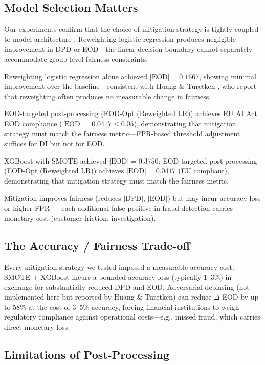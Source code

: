 \documentclass[conference]{IEEEtran}
\begin{document}
\subsection{Model Selection Matters}

Our experiments confirm that the choice of mitigation strategy is tightly coupled to model architecture \cite{huang2025}. Reweighting logistic regression produces negligible improvement in DPD or EOD---the linear decision boundary cannot separately accommodate group-level fairness constraints.

Reweighting logistic regression alone achieved $|\mathrm{EOD}| = 0.1667$, showing minimal improvement over the baseline---consistent with Huang \& Turetken \cite{huang2025}, who report that reweighting often produces no measurable change in fairness.

EOD-targeted post-processing (EOD-Opt (Reweighted LR)) achieves EU AI Act EOD compliance ($|\mathrm{EOD}| = 0.0417 \leq 0.05$), demonstrating that mitigation strategy must match the fairness metric---FPR-based threshold adjustment suffices for DI but not for EOD.

XGBoost with SMOTE achieved $|\mathrm{EOD}| = 0.3750$; EOD-targeted post-processing (EOD-Opt (Reweighted LR)) achieves $|\mathrm{EOD}| = 0.0417$ (EU compliant), demonstrating that mitigation strategy must match the fairness metric.

Mitigation improves fairness (reduces $|\mathrm{DPD}|$, $|\mathrm{EOD}|$) but may incur accuracy loss or higher FPR — each additional false positive in fraud detection carries monetary cost (customer friction, investigation).

\subsection{The Accuracy / Fairness Trade-off}

Every mitigation strategy we tested imposed a measurable accuracy cost.  SMOTE + XGBoost incurs a bounded accuracy loss (typically 1--3\%) in exchange for substantially reduced DPD and EOD. Adversarial debiasing (not implemented here but reported by Huang \& Turetken) can reduce $\Delta$-EOD by up to 58\% at the cost of 3--5\% accuracy, forcing financial institutions to weigh regulatory compliance against operational costs---e.g., missed fraud, which carries direct monetary loss.

\subsection{Limitations of Post-Processing}
\end{document}
